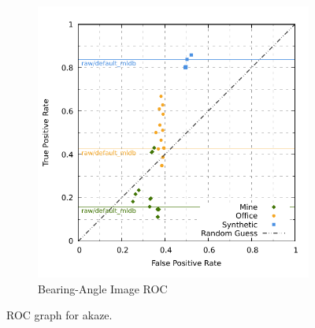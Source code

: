 \begin{figure}[htp]
\begin{subfigure}[t]{0.45\linewidth}
    \includegraphics[width=\linewidth]{chapter06/results/AKAZE/bearing/roc.pdf}
    \caption{Bearing-Angle Image ROC}
\end{subfigure}
    \caption{ROC graph for \acrshort{akaze}.}\label{fig:roc_akaze}
\end{figure}
